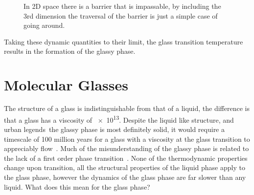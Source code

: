 \begin{figure}
    \caption{In 2D space there is a barrier that is impassable, by including the 3rd dimension the traversal of the barrier is just a simple case of going around.}
    \label{fig:barrier dimensions}
\end{figure}

Taking these dynamic quantities to their limit, the glass transition temperature results in the formation of the glassy phase.


\section{Molecular Glasses}

The structure of a glass is indistinguishable from that of a liquid, the difference is that a glass has a viscosity of \SI{e13}{\poise}. Despite the liquid like structure, and urban legends~\tocite the glassy phase is most definitely solid, it would require a timescale of 100 million years for a glass with a viscosity at the glass transition to appreciably flow~\tocite. Much of the misunderstanding of the glassy phase is related to the lack of a first order phase transition~\tocite. None of the thermodynamic properties change upon transition, all the structural properties of the liquid phase apply to the glass phase, however the dynamics of the glass phase are far slower than any liquid. What does this mean for the glass phase? 






